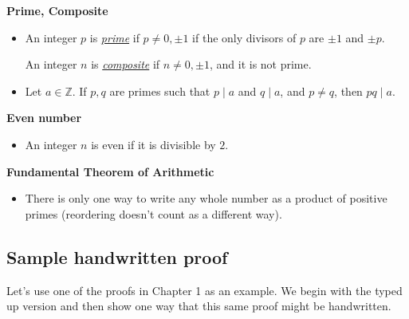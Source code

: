 \documentclass[11pt]{article}
\newcommand{\Z}{\mathbb{Z}}
\newcommand\divides{\;|\;}
\theoremstyle{definition}
\begin{document}
{\bf Prime, Composite} 
\vspace*{-6pt}
\begin{itemize} 
\item An integer $p$ is \underline{{\it prime}} if $p\neq 0, \pm1 $ if the only divisors of $p$ are $\pm 1$ and $\pm p$. 

An integer $n$ is \underline{\it composite} if $n\neq 0, \pm 1$, and it is not prime.

\item Let $a\in \Z$. If $p,q$ are primes such that $p\divides a$ and $q\divides a$, and $p\neq q$, then $pq\divides a$.
\end{itemize}

{\bf Even number}
\vspace*{-6pt}
\begin{itemize} 
\item[] An integer $n$ is even if it is divisible by $2$.
\end{itemize}

{\bf Fundamental Theorem of Arithmetic} 
\vspace*{-6pt}
\begin{itemize}\item[] There is only one way to write any whole number as a product of positive primes (reordering doesn't count as a different way).
\end{itemize}



\newpage
\subsection{Sample handwritten proof}
\label{s: sample handwritten proof}

Let's use one of the proofs in Chapter 1 as an example.  We begin with the typed up version and then show one way that this same proof might be handwritten.
\end{document}
